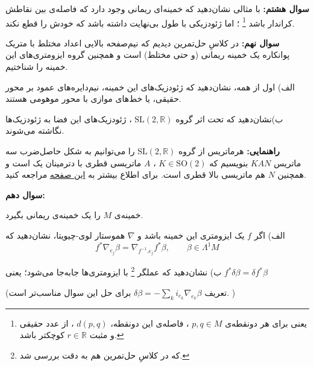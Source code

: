 \documentclass{article}
\newenvironment{parind}{%
	\par%
	\medskip
	\leftskip=0mm\rightskip=7mm
	\noindent\ignorespaces}{%
	\par\medskip}
\begin{document}
	\vspace{-1em}
	\endline
	
	\vspace{-1em}
	\textbf{سوال هشتم:}
	با مثالی نشان‌دهید که خمینه‌ای ریمانی وجود دارد که فاصله‌ی بین نقاطش کراندار باشد
	\footnote{
	یعنی برای هر دونقطه‌ی 
	$p,q\in M$
	، فاصله‌ی این دونقطه،
	$d(p,q)$
	، از عدد حقیقی و مثبت 
	$r\in \mathbb{R}$
	کوچکتر باشد.
	}
	؛ اما ژئودزیکی با طول بی‌نهایت داشته باشد که خودش را قطع نکند.
	
	\vspace{-1em}
	\endline
	
	\vspace{-1em}
	\textbf{سوال نهم:}
	در کلاسِ حل‌تمرین دیدیم که نیم‌صفحه بالایی اعداد مختلط با متریک پوانکاره یک خمینه ریمانی (و حتی مختلط) است و همچنین گروه ایزومتری‌های این خمینه را شناختیم. 
	
	\begin{parind}
		الف) اول از همه، نشان‌دهید که ژئودزیک‌های این خمینه، نیم‌دایره‌های عمود بر محور حقیقی، یا خط‌های موازی با محور موهومی هستند.
		
		ب)نشان‌دهید که تحت اثر گروه 
		$\text{SL}(2,\mathbb{R})$
		، ژئودزیک‌های این فضا به ژئودزیک‌ها نگاشته می‌شوند.
	\end{parind}
	
	\newpage
	\textbf{راهنمایی:}
	هرماتریس از گروه 
	$\text{SL}(2,\mathbb{R})$
	را می‌توانیم به شکل حاصل‌ضرب سه ماتریس $KAN$ بنویسیم که 
	$K \in \text{SO}(2)$
	، $A$ ماتریسی قطری با دترمینان یک است و همچنین $N$ هم ماتریسی بالا قطری است. برای اطلاع بیشتر به 
	\href{https://en.wikipedia.org/wiki/Iwasawa_decomposition}{این صفحه}
	مراجعه کنید.
	
	
	
	\vspace{-1em}
	\endline
	
	\vspace{-1em}
	\textbf{سوال دهم:}
	
	خمینه‌ی $M$ را یک خمینه‌ی ریمانی بگیرد.
	
	\begin{parind}
		الف) اگر $f$ یک ایزومتری این خمینه باشد و $\nabla$ هموستار لوی-چیویتا، نشان‌دهید که
		\[
		f^* \nabla_{e_j} \beta = \nabla_{f^{-1}.e_j} f^*\beta , \qquad \beta \in \Lambda^1M
		\]
		
		ب)
		نشان‌دهید که عملگر 
		\footnote{که در کلاس‌ِ حل‌تمرین‌ هم به دقت بررسی شد.}
		با ایزومتری‌ها جابه‌جا می‌شود؛ یعنی
		$f^* \delta \beta = \delta f^*\beta$
		
		(تعریف 
		$\delta \beta = -\sum_{k} i_{e_k} \nabla_{e_k} \beta$
		برای حل این سوال مناسب‌تر است.
		)
		
	\end{parind}
	
\end{document}
